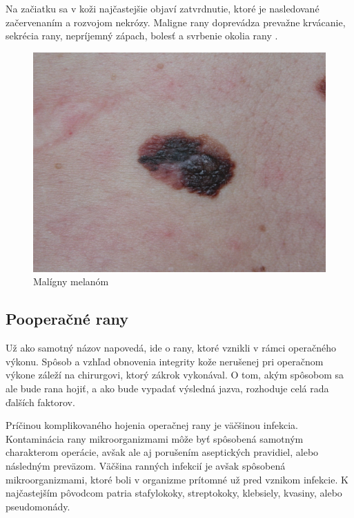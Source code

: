 Na začiatku sa v koži najčastejšie objaví zatvrdnutie, ktoré je nasledované začervenaním a rozvojom nekrózy. Maligne rany doprevádza prevažne krvácanie, sekrécia rany, nepríjemný zápach, bolesť a svrbenie okolia rany \cite{pcCdSrbbhhlr5YcQ, Hlinkova2015}.
\begin{figure}[h]
  \centering
  \includegraphics[scale=0.20]{fig/maligna-rana.png}
  \caption{Malígny melanóm \cite{Svehlik2012}}
  \label{fig:maligny-melanom}
\end{figure}

\subsection{Pooperačné rany}
Už ako samotný názov napovedá, ide o rany, ktoré vznikli v rámci operačného výkonu. Spôsob a vzhľad obnovenia integrity kože nerušenej pri operačnom výkone záleží na chirurgovi, ktorý zákrok vykonával. O tom, akým spôsobom sa ale bude rana hojiť, a ako bude vypadať výsledná jazva, rozhoduje celá rada ďalších faktorov.

Príčinou komplikovaného hojenia operačnej rany je väčšinou infekcia. Kontaminácia rany mikroorganizmami môže byť spôsobená samotným charakterom operácie, avšak ale aj porušením aseptických pravidiel, alebo následným preväzom. Väčšina ranných infekcií je avšak spôsobená mikroorganizmami, ktoré boli v organizme prítomné už pred vznikom infekcie. K najčastejším pôvodcom patria stafylokoky, streptokoky, klebsiely, kvasiny, alebo pseudomonády.

